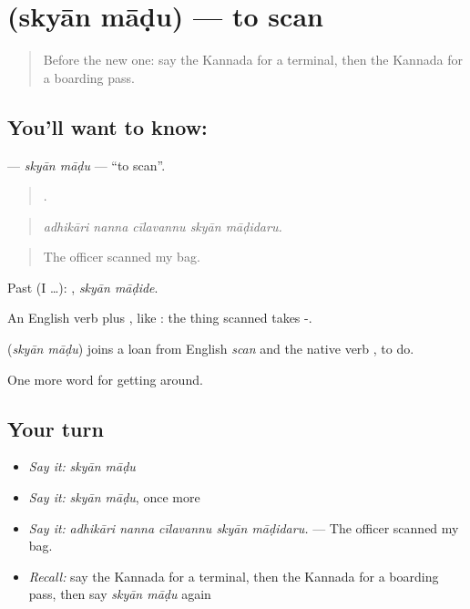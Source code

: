 \section[\texorpdfstring{\kn{ಸ್ಕ್ಯಾನ್} \kn{ಮಾಡು} (skyān māḍu)}{ಸ್ಕ್ಯಾನ್ ಮಾಡು (skyān māḍu)}]{  (skyān māḍu) — to scan}

\label{lesson:KA-C437-skyan-madu}



\begin{quote}
Before the new one: say the Kannada for a terminal, then the Kannada for a boarding pass.
\end{quote}

\subsection*{You'll want to know:  }
\textbf{ } — \emph{skyān māḍu} — \textquotedblleft{}to scan\textquotedblright{}.

\begin{quote}
    .
\end{quote}

\begin{quote}
\emph{adhikāri nanna cīlavannu skyān māḍidaru.}
\end{quote}

\begin{quote}
The officer scanned my bag.
\end{quote}

Past (I …):  , \emph{skyān māḍide}.

An English verb plus , like  : the thing scanned takes -.

\begin{cousinweb}
\textbf{ } (\emph{skyān māḍu}) joins a loan from English \emph{scan} and the native verb , to do.
\end{cousinweb}

\begin{grammarlens}[title={What you've built}]
One more word for getting around.
\end{grammarlens}

\subsection*{Your turn}
\begin{itemize}
\raggedright
  \item \emph{Say it:} \emph{skyān māḍu}
  \item \emph{Say it:} \emph{skyān māḍu}, once more
  \item \emph{Say it:} \emph{adhikāri nanna cīlavannu skyān māḍidaru.} — The officer scanned my bag.
  \item \emph{Recall:} say the Kannada for a terminal, then the Kannada for a boarding pass, then say \emph{skyān māḍu} again
\end{itemize}

